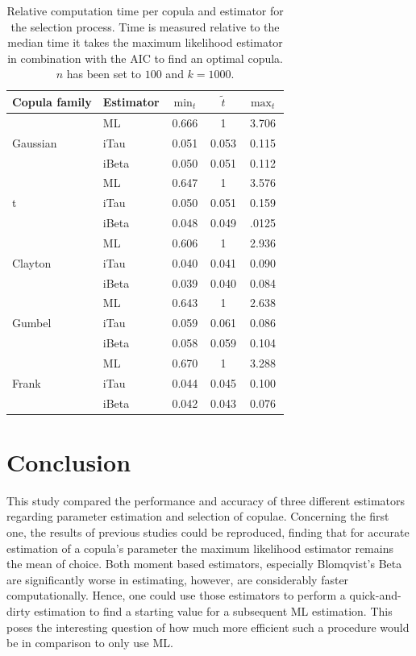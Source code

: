 \begin{table}[h!]
	\centering
{\renewcommand{\arraystretch}{1.3}
	\begin{tabular}{ll|ccc}
		Copula family             & Estimator & $\min_t$   & $\tilde{t}$ & $\max_t$   \\ \hline \hline
		\multirow{3}{*}{Gaussian} & ML        & 0.666 & 1      & 3.706 \\
		& iTau      & 0.051 & 0.053  & 0.115 \\
		& iBeta     & 0.050 & 0.051  & 0.112 \\ \hline
		\multirow{3}{*}{t}        & ML        & 0.647 & 1      & 3.576 \\
		& iTau      & 0.050 & 0.051  & 0.159 \\
		& iBeta     & 0.048 & 0.049  & .0125 \\ \hline
		\multirow{3}{*}{Clayton}  & ML        & 0.606 & 1      & 2.936 \\
		& iTau      & 0.040 & 0.041  & 0.090 \\
		& iBeta     & 0.039 & 0.040  & 0.084 \\ \hline
		\multirow{3}{*}{Gumbel}   & ML        & 0.643 & 1      & 2.638 \\
		& iTau      & 0.059 & 0.061  & 0.086 \\
		& iBeta     & 0.058 & 0.059  & 0.104 \\ \hline
		\multirow{3}{*}{Frank}    & ML        & 0.670 & 1      & 3.288 \\
		& iTau      & 0.044 & 0.045  & 0.100 \\
		& iBeta     & 0.042 & 0.043  & 0.076
	\end{tabular}
}
\caption[Relative computation time per copula and estimator for copula selection]{Relative computation time per copula and estimator for the selection process. Time is measured relative to the median time it takes the maximum likelihood estimator in combination with the AIC to find an optimal copula. $n$ has been set to $100$ and $k = 1000$. }
\label{comp-time-seletion}
\end{table}

\section{Conclusion}

This study compared the performance and accuracy of three different estimators regarding parameter estimation and selection of copulae. Concerning the first one, the results of previous studies could be reproduced, finding that for accurate estimation of a copula's parameter the maximum likelihood estimator remains the mean of choice. Both moment based estimators, especially Blomqvist's Beta are significantly worse in estimating, however, are considerably faster computationally. Hence, one could use those estimators to perform a quick-and-dirty estimation to find a starting value for a subsequent ML estimation. This poses the interesting question of how much more efficient such a procedure would be in comparison to only use ML.

